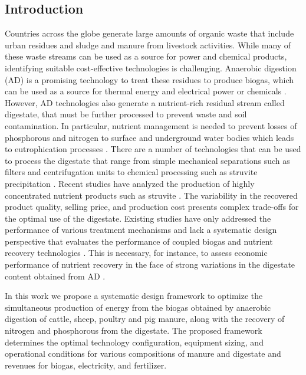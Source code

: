 \begin{refsection}[referencesCh2]
\section{Introduction}
Countries across the globe generate large amounts of organic waste that include urban residues and sludge and manure from livestock activities. While many of these waste streams can be used as a source for power and chemical products, identifying suitable cost-effective technologies
is challenging. Anaerobic digestion (AD) is a promising technology to treat these residues to produce biogas, which can be used as a source for thermal energy and electrical power \citep{Leon} or chemicals \citep{hernandez2016optimal}. However, AD technologies also generate a nutrient-rich residual stream called digestate, that must be further processed to prevent waste and soil contamination. In particular, nutrient management is needed to prevent losses of phosphorous and nitrogen to surface and underground water bodies which leads to eutrophication processes \citep{Sampat2017, GarciaSerrano}. There are a number of technologies that can be used to process the digestate that range from simple mechanical separations such as filters \citep{gustafsson2008phosphate} and centrifugation units \citep{meixner2015effect} to chemical processing such as struvite precipitation \citep{bhuiyan2008phosphorus}. Recent studies have analyzed the production of highly concentrated nutrient products such as struvite \citep{lin2015phosphorus}. The variability in the recovered product quality, selling price, and production cost presents complex trade-offs for the optimal use of the digestate. Existing studies have only addressed the performance of various treatment mechanisms and lack a systematic design perspective that evaluates the performance of coupled biogas and nutrient recovery technologies \citep{drosg2015nutrient}. This is necessary, for instance, to assess economic performance of nutrient recovery in the face of strong variations in the digestate content obtained from AD \citep{AlSeadi2008}.

In this work we propose a systematic design framework to optimize the simultaneous production of energy from the biogas obtained by anaerobic digestion of cattle, sheep, poultry and pig manure, along with the recovery of nitrogen and phosphorous from the digestate. The proposed framework determines the optimal technology configuration, equipment sizing, and operational conditions for various compositions of manure and digestate and revenues for biogas, electricity, and fertilizer. 


\end{refsection}
